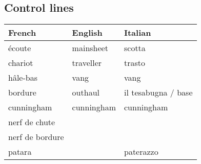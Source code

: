 \documentclass[a4paper, 12pt, twoside]{article}
\begin{document}
    \begin{indt}{\section{Control lines}} %
        \begin{tabular}{|l|l|l|}
            \hline %
            \textbf{French}
            & \textbf{English}
            & \textbf{Italian}
            \\
            \hline
            \hline %
            écoute %
            & mainsheet
            & scotta
            \\
            \hline %
            chariot %
            & traveller
            & trasto
            \\
            \hline %
            hâle-bas %
            & vang
            & vang
            \\
            \hline %
            bordure %
            & outhaul 
            & il tesabugna / base
            \\
            \hline %
            cunningham %
            & cunningham
            & cunningham
            \\
            \hline %
            nerf de chute %
            &
            &
            \\
            \hline %
            nerf de bordure %
            &
            &
            \\
            \hline %
            patara %
            &
            & paterazzo
            \\
            \hline %
        \end{tabular}
    \end{indt} %
\end{document}
